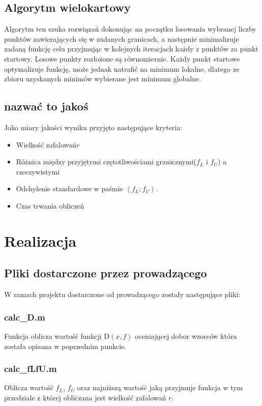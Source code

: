 \documentclass[10pt,a4paper]{article}
\begin{document}
\subsection{Algorytm wielokartowy}
Algorytm ten szuka rozwiązań dokonując na początku losowania wybranej liczby punktów zawierających się w zadanych granicach, a następnie minimalizuje zadaną funkcję celu przyjmując w kolejnych iteracjach każdy z punktów za punkt startowy. Losowe punkty rozłożone są równomiernie. Każdy punkt startowe optymalizuje funkcję, może jednak natrafić na minimum lokalne, dlatego ze zbioru uzyskanych minimów wybierane jest minimum globalne.

\subsection{nazwać to jakoś}
Jako miary jakości wyniku przyjęto następujące kryteria:
\begin{itemize}
\item Wielkość zafalowań$r$
\item Różnica między przyjętymi czętotliwościami granicznymi($f_L$ i $f_U$) a rzeczywistymi
\item Odchylenie standardowe w paśmie $\left\langle f_L;f_U \right\rangle$.
\item Czas trwania obliczeń
\end{itemize}

\section{Realizacja}

\subsection{Pliki dostarczone przez prowadzącego}
W ramach projektu dostarczone od prowadzącego zostały następujące pliki:

\subsubsection{calc\_D.m}
Funkcja oblicza wartość funkcji D$(x,f)$ oceniającej dobor wzorców która została opisana w poprzednim
punkcie.
\subsubsection{calc\_fLfU.m}
Oblicza wartość $f_L$, $f_U$ oraz najniższą wartość jaką przyjmuje funkcja w tym przedziale z której obliczana jest wielkość zafalowań $r$.
\end{document}
